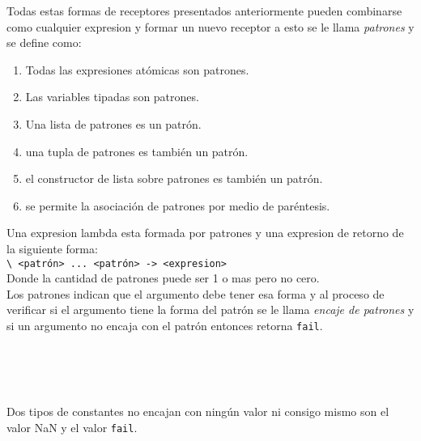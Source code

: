       Todas estas formas de receptores presentados anteriormente pueden combinarse como cualquier expresion y formar un nuevo receptor a esto se le llama {\it patrones} y se define como:
      
      \begin{enumerate}
         \item Todas las expresiones atómicas son patrones.
         \item Las variables tipadas son patrones.
         \item Una lista de patrones es un patrón.
         \item una tupla de patrones es también un patrón.
         \item el constructor de lista sobre patrones es también un patrón.
         \item se permite la asociación de patrones por medio de paréntesis.
      \end{enumerate}
      
      Una expresion lambda esta formada por patrones y una expresion de retorno de la siguiente forma:
      \\
      
      \texttt{\textbackslash~<patrón>~...~<patrón> ->~<expresion>}
      \\
      
      Donde la cantidad de patrones puede ser 1 o mas pero no cero.
      \\
      
      Los patrones indican que el argumento debe tener esa forma y al proceso de verificar si el argumento tiene la forma del patrón se le llama {\it encaje de patrones} y si un argumento no encaja con el patrón entonces retorna \texttt{fail}.
      
      \begin{fxcode}
         \\
         \outcode{[6, 4, 5]}\\
         \\
      \end{fxcode}
      
      Dos tipos de constantes no encajan con ningún valor ni consigo mismo son el valor NaN y el valor \texttt{fail}.
      
      \begin{fxcode}
         \\
         \\
         \\
         \\
         \\
         \\
         \\
      \end{fxcode}
      

